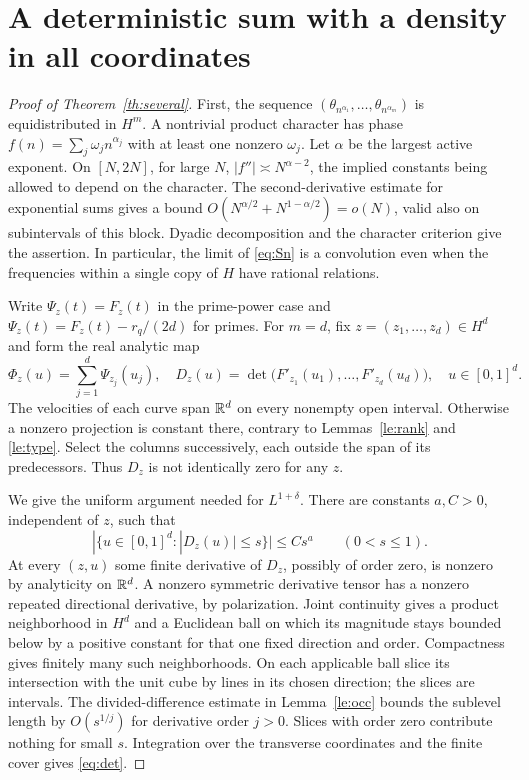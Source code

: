 \section{A deterministic sum with a density in all coordinates}
\begin{proof}[Proof of Theorem~\ref{th:several}]
First, the sequence
\((\theta_{n^{\alpha_1}},\ldots,\theta_{n^{\alpha_m}})\) is equidistributed in \(H^m\).
A nontrivial product character has phase \(f(n)=\sum_j\omega_j n^{\alpha_j}\) with at least one nonzero \(\omega_j\). Let \(\alpha\) be the largest active exponent. On \([N,2N]\), for large \(N\), \(|f''|\asymp N^{\alpha-2}\), the implied constants being allowed to depend on the character. The second-derivative estimate for exponential sums \cite{gk} gives a bound \(O(N^{\alpha/2}+N^{1-\alpha/2})=o(N)\), valid also on subintervals of this block. Dyadic decomposition and the character criterion give the assertion. In particular, the limit of \eqref{eq:Sn} is a convolution even when the frequencies within a single copy of \(H\) have rational relations.

Write \(\Psi_z(t)=F_z(t)\) in the prime-power case and \(\Psi_z(t)=F_z(t)-r_q/(2d)\) for primes. For \(m=d\), fix \(z=(z_1,\ldots,z_d)\in H^d\) and form the real analytic map
\[
 \Phi_z(u)=\sum_{j=1}^d\Psi_{z_j}(u_j),\quad
 D_z(u)=\det\big(F'_{z_1}(u_1),\ldots,F'_{z_d}(u_d)\big),\quad u\in[0,1]^d.
\]
The velocities of each curve span \(\mathbb R^d\) on every nonempty open interval. Otherwise a nonzero projection is constant there, contrary to Lemmas~\ref{le:rank} and \ref{le:type}. Select the columns successively, each outside the span of its predecessors. Thus \(D_z\) is not identically zero for any \(z\).

We give the uniform argument needed for \(L^{1+\delta}\). There are constants \(a,C>0\), independent of \(z\), such that
\begin{equation}
 |\{u\in[0,1]^d: |D_z(u)|\le s\}|\le Cs^a\qquad(0<s\le1).
 \label{eq:det}
\end{equation}
At every \((z,u)\) some finite derivative of \(D_z\), possibly of order zero, is nonzero by analyticity on \(\mathbb R^d\). A nonzero symmetric derivative tensor has a nonzero repeated directional derivative, by polarization. Joint continuity gives a product neighborhood in \(H^d\) and a Euclidean ball on which its magnitude stays bounded below by a positive constant for that one fixed direction and order. Compactness gives finitely many such neighborhoods. On each applicable ball slice its intersection with the unit cube by lines in its chosen direction; the slices are intervals. The divided-difference estimate in Lemma~\ref{le:occ} bounds the sublevel length by \(O(s^{1/j})\) for derivative order \(j>0\). Slices with order zero contribute nothing for small \(s\). Integration over the transverse coordinates and the finite cover gives \eqref{eq:det}.


\end{proof}
